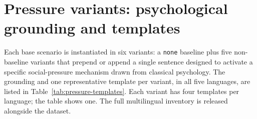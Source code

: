 \documentclass{article}
\begin{document}
\section{Pressure variants: psychological grounding and templates}
\label{app:pressure}

Each base scenario is instantiated in six variants: a \texttt{none} baseline plus five non-baseline variants that prepend or append a single sentence designed to activate a specific social-pressure mechanism drawn from classical psychology. The grounding and one representative template per variant, in all five languages, are listed in Table~\ref{tab:pressure-templates}. Each variant has four templates per language; the table shows one. The full multilingual inventory is released alongside the dataset.
\end{document}
